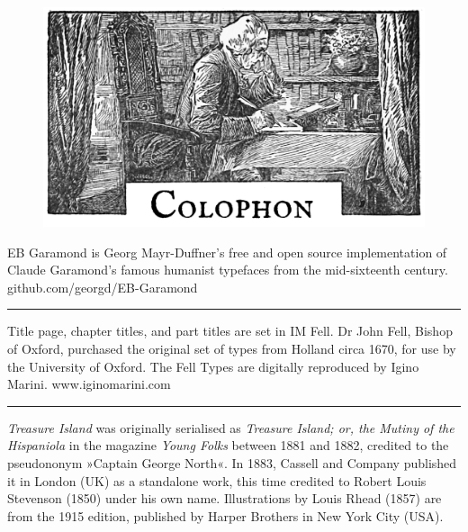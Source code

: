\documentclass[
a5paper,
BCOR=7mm,
twoside,
DIV=calc,
11pt,
usegeometry,
chapterprefix,
headings=big]{scrbook} %
\begin{document}
\chapter*{}
\begin{figure}[t!]
\centering
\includegraphics[width=\linewidth]{colophon}
\end{figure}
\centering
\vspace{-0.8cm}
EB Garamond is Georg Mayr-Duffner's free and open source implementation of Claude Garamond’s famous humanist typefaces from the mid-sixteenth century. github.com/georgd/EB-Garamond

\rule{0.5\textwidth}{.4pt}

Title page, chapter titles, and part titles are set in IM Fell. Dr John Fell, Bishop of Oxford, purchased the original set of types from Holland circa 1670, for use by the University of Oxford. The Fell Types are digitally reproduced by Igino Marini. www.iginomarini.com

%
\rule{0.5\textwidth}{.4pt}

\textit{Treasure Island} was originally serialised as \textit{Treasure Island; or, the Mutiny of the Hispaniola} in the magazine \textit{Young Folks} between 1881 and 1882, credited to the pseudononym »Captain George North«. In 1883, Cassell and Company published it in London (UK) as a standalone work, this time credited to Robert Louis Stevenson (1850) under his own name. Illustrations by Louis Rhead (1857) are from the 1915 edition, published by Harper Brothers in New York City (USA).
\end{document}
